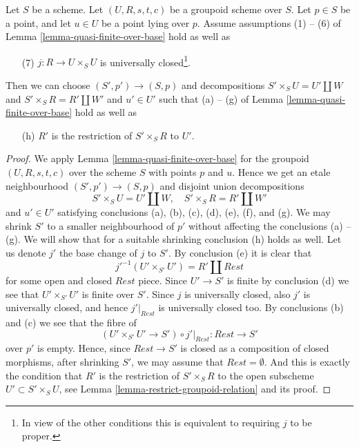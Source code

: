 \begin{lemma}
\label{lemma-quasi-finite-over-base-j-proper}
Let $S$ be a scheme.
Let $(U, R, s, t, c)$ be a groupoid scheme over $S$.
Let $p \in S$ be a point, and let $u \in U$ be a point lying over $p$.
Assume assumptions (1) -- (6) of
Lemma \ref{lemma-quasi-finite-over-base}
hold as well as
\begin{enumerate}
\item[(7)] $j : R \to U \times_S U$ is universally closed\footnote{In view of
the other conditions this is equivalent to requiring $j$ to be proper.}.
\end{enumerate}
Then we can choose $(S', p') \to (S, p)$ and decompositions
$S' \times_S U = U' \amalg W$ and $S' \times_S R = R' \amalg W'$
and $u' \in U'$ such that (a) -- (g) of
Lemma \ref{lemma-quasi-finite-over-base}
hold as well as
\begin{enumerate}
\item[(h)] $R'$ is the restriction of $S' \times_S R$ to $U'$.
\end{enumerate}
\end{lemma}

\begin{proof}
We apply Lemma \ref{lemma-quasi-finite-over-base} for the
groupoid $(U, R, s, t, c)$ over the scheme $S$ with points $p$ and $u$.
Hence we get an etale neighbourhood
$(S', p') \to (S, p)$ and disjoint union decompositions
$$
S' \times_S U = U' \amalg W, \quad
S' \times_S R = R' \amalg W'
$$
and $u' \in U'$ satisfying conclusions (a), (b), (c), (d), (e), (f), and (g).
We may shrink $S'$ to a smaller neighbourhood of $p'$ without
affecting the conclusions (a) -- (g). We will show that for a suitable
shrinking conclusion (h) holds as well.
Let us denote $j'$ the base change of $j$ to $S'$.
By conclusion (e) it is clear that
$$
j'^{-1}(U' \times_{S'} U') = R' \amalg Rest
$$
for some open and closed $Rest$ piece. Since $U' \to S'$ is finite
by conclusion (d) we see that $U' \times_{S'} U'$ is finite over $S'$.
Since $j$ is universally closed, also $j'$ is universally closed, and
hence $j'|_{Rest}$ is universally closed too. By conclusions
(b) and (c) we see that the fibre of
$$
(U' \times_{S'} U' \to S') \circ j'|_{Rest} :
Rest
\longrightarrow
S'
$$
over $p'$ is empty. Hence, since $Rest \to S'$ is closed as a composition
of closed morphisms, after shrinking $S'$, we may assume that
$Rest = \emptyset$. And this is exactly the condition that $R'$ is
the restriction of $S' \times_S R$ to the open subscheme
$U' \subset S' \times_S U$, see
Lemma \ref{lemma-restrict-groupoid-relation}
and its proof.
\end{proof}

